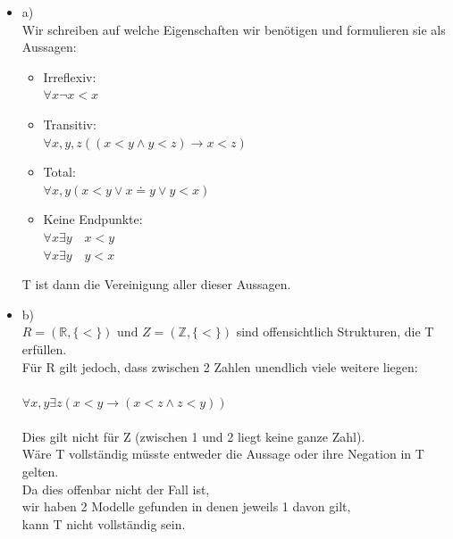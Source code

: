 \documentclass[a4paper]{scrartcl}
\begin{document}
    \begin{itemize}
        \item a)\\
            Wir schreiben auf welche Eigenschaften wir benötigen und formulieren sie als Aussagen:\\
            \begin{itemize}
                \item Irreflexiv:\\
                    $\forall x \neg x < x$\\
                \item Transitiv:\\
                    $\forall x,y,z ((x < y \land y < z) \rightarrow x < z)$\\
                \item Total:\\
                    $\forall x,y (x < y \lor x \doteq y \lor y < x)$\\
                \item Keine Endpunkte:\\
                    $\forall x \exists y \quad x < y$\\
                    $\forall x \exists y \quad y < x$\\
            \end{itemize}
            T ist dann die Vereinigung aller dieser Aussagen.\\
        \item b)\\
            $R = (\mathds{R}, \{<\}) \text{ und } Z = (\mathds{Z}, \{<\})$ sind offensichtlich Strukturen, die T erfüllen.\\
            Für R gilt jedoch, dass zwischen 2 Zahlen unendlich viele weitere liegen:\\
            \\$\forall x,y \exists z (x < y \rightarrow (x < z \land z < y))$\\
            \\Dies gilt nicht für Z (zwischen 1 und 2 liegt keine ganze Zahl).\\
            Wäre T vollständig müsste entweder die Aussage oder ihre Negation in T gelten.\\
            Da dies offenbar nicht der Fall ist,\\
            wir haben 2 Modelle gefunden in denen jeweils 1 davon gilt,\\
            kann T nicht vollständig sein.\\
    \end{itemize}
\end{document}
